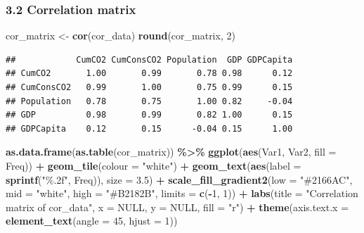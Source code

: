 \documentclass[
]{article}
\newenvironment{Shaded}{\begin{snugshade}}{\end{snugshade}}
\newcommand{\AttributeTok}[1]{\textcolor[rgb]{0.13,0.29,0.53}{#1}}
\newcommand{\ConstantTok}[1]{\textcolor[rgb]{0.56,0.35,0.01}{#1}}
\newcommand{\DecValTok}[1]{\textcolor[rgb]{0.00,0.00,0.81}{#1}}
\newcommand{\FloatTok}[1]{\textcolor[rgb]{0.00,0.00,0.81}{#1}}
\newcommand{\FunctionTok}[1]{\textcolor[rgb]{0.13,0.29,0.53}{\textbf{#1}}}
\newcommand{\NormalTok}[1]{#1}
\newcommand{\OtherTok}[1]{\textcolor[rgb]{0.56,0.35,0.01}{#1}}
\newcommand{\SpecialCharTok}[1]{\textcolor[rgb]{0.81,0.36,0.00}{\textbf{#1}}}
\newcommand{\StringTok}[1]{\textcolor[rgb]{0.31,0.60,0.02}{#1}}
\begin{document}
\subsubsection{3.2 Correlation matrix}\label{correlation-matrix}

\begin{Shaded}
\begin{Highlighting}[]
\NormalTok{cor\_matrix }\OtherTok{\textless{}{-}} \FunctionTok{cor}\NormalTok{(cor\_data)}
\FunctionTok{round}\NormalTok{(cor\_matrix, }\DecValTok{2}\NormalTok{)}
\end{Highlighting}
\end{Shaded}

\begin{verbatim}
##            CumCO2 CumConsCO2 Population  GDP GDPCapita
## CumCO2       1.00       0.99       0.78 0.98      0.12
## CumConsCO2   0.99       1.00       0.75 0.99      0.15
## Population   0.78       0.75       1.00 0.82     -0.04
## GDP          0.98       0.99       0.82 1.00      0.15
## GDPCapita    0.12       0.15      -0.04 0.15      1.00
\end{verbatim}

\begin{Shaded}
\begin{Highlighting}[]
\FunctionTok{as.data.frame}\NormalTok{(}\FunctionTok{as.table}\NormalTok{(cor\_matrix)) }\SpecialCharTok{\%\textgreater{}\%}
  \FunctionTok{ggplot}\NormalTok{(}\FunctionTok{aes}\NormalTok{(Var1, Var2, }\AttributeTok{fill =}\NormalTok{ Freq)) }\SpecialCharTok{+}
  \FunctionTok{geom\_tile}\NormalTok{(}\AttributeTok{colour =} \StringTok{"white"}\NormalTok{) }\SpecialCharTok{+}
  \FunctionTok{geom\_text}\NormalTok{(}\FunctionTok{aes}\NormalTok{(}\AttributeTok{label =} \FunctionTok{sprintf}\NormalTok{(}\StringTok{"\%.2f"}\NormalTok{, Freq)), }\AttributeTok{size =} \FloatTok{3.5}\NormalTok{) }\SpecialCharTok{+}
  \FunctionTok{scale\_fill\_gradient2}\NormalTok{(}\AttributeTok{low =} \StringTok{"\#2166AC"}\NormalTok{, }\AttributeTok{mid =} \StringTok{"white"}\NormalTok{, }\AttributeTok{high =} \StringTok{"\#B2182B"}\NormalTok{,}
                       \AttributeTok{limits =} \FunctionTok{c}\NormalTok{(}\SpecialCharTok{{-}}\DecValTok{1}\NormalTok{, }\DecValTok{1}\NormalTok{)) }\SpecialCharTok{+}
  \FunctionTok{labs}\NormalTok{(}\AttributeTok{title =} \StringTok{"Correlation matrix of cor\_data"}\NormalTok{, }\AttributeTok{x =} \ConstantTok{NULL}\NormalTok{, }\AttributeTok{y =} \ConstantTok{NULL}\NormalTok{,}
       \AttributeTok{fill =} \StringTok{"r"}\NormalTok{) }\SpecialCharTok{+}
  \FunctionTok{theme}\NormalTok{(}\AttributeTok{axis.text.x =} \FunctionTok{element\_text}\NormalTok{(}\AttributeTok{angle =} \DecValTok{45}\NormalTok{, }\AttributeTok{hjust =} \DecValTok{1}\NormalTok{))}
\end{Highlighting}
\end{Shaded}
\end{document}
